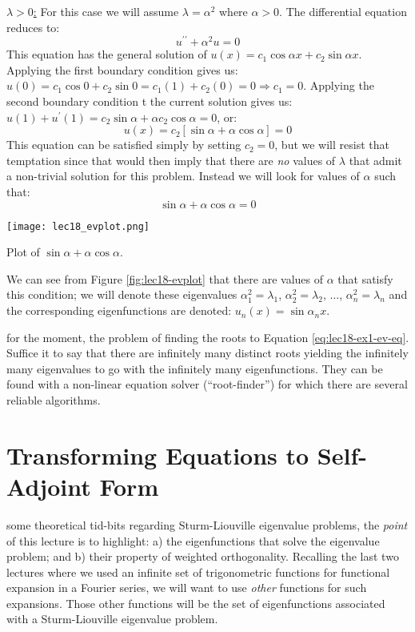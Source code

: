 \vspace{0.5cm}

\noindent\underline{$\lambda > 0$:} For this case we will assume $\lambda = \alpha^2$ where $\alpha > 0$.  The differential equation reduces to:
\begin{equation*}
u^{\prime \prime} + \alpha^2 u = 0
\end{equation*}
This equation has the general solution of $u(x) = c_1 \cos{\alpha x} + c_2 \sin{\alpha x}$.  Applying the first boundary condition gives us: $u(0) = c_1 \cos{0} + c_2 \sin{0} = c_1(1) + c_2(0) = 0 \Rightarrow c_1 = 0$.  Applying the second boundary condition t the current solution gives us: $u(1) + u^{\prime}(1) = c_2 \sin{\alpha} + \alpha c_2 \cos{\alpha} = 0$, or:
\begin{equation}
u(x) = c_2\left[\sin{\alpha} + \alpha \cos{\alpha}\right] = 0
\label{eq:lec18-ex1}
\end{equation}
This equation can be satisfied simply by setting $c_2 = 0$, but we will resist that temptation since that would then imply that there are \emph{no} values of $\lambda$ that admit a non-trivial solution for this problem.  Instead we will look for values of $\alpha$ such that:
\begin{equation}
\sin{\alpha} + \alpha \cos{\alpha} = 0
\label{eq:lec18-ex1-ev-eq}
\end{equation}
\begin{marginfigure}
\texttt{[image: lec18\_evplot.png]}
\caption{Plot of $\sin{\alpha} + \alpha \cos{\alpha}$.}
\label{fig:lec18-evplot}
\end{marginfigure}
We can see from Figure \ref{fig:lec18-evplot} that there are values of $\alpha$ that satisfy this condition; we will denote these eigenvalues $\alpha_1^2 = \lambda_1$, $\alpha_2^2 = \lambda_2$, $\dots$, $\alpha_n^2 = \lambda_n$ and the corresponding eigenfunctions are denoted: $u_n(x) = \sin{\alpha_n x}$.

 for the moment, the problem of finding the roots to Equation \ref{eq:lec18-ex1-ev-eq}. Suffice it to say that there are infinitely many distinct roots yielding the infinitely many eigenvalues to go with the infinitely many eigenfunctions. They can be found with a non-linear equation solver (``root-finder'') for which there are several reliable algorithms.

\section{Transforming Equations to Self-Adjoint Form}
 some theoretical tid-bits regarding Sturm-Liouville eigenvalue problems, the \emph{point} of this lecture is to highlight: a) the eigenfunctions that solve the eigenvalue problem; and b) their property of weighted orthogonality.  Recalling the last two lectures where we used an infinite set of trigonometric functions for functional expansion in a Fourier series, we will want to use \emph{other} functions for such expansions. Those other functions will be the set of eigenfunctions associated with a Sturm-Liouville eigenvalue problem.   

